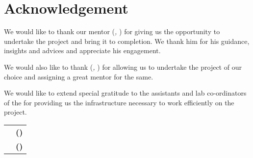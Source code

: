 \clearpage
\chapter*{Acknowledgement}
\label{cha:acknowledgement}
We would like to thank our mentor \textbf{\mentorName{}} (\textit{\mentorJobTitle{}, \departmentName{}}) for giving us the opportunity to undertake the project and bring it to completion. We thank him for his guidance, insights and advices and appreciate his engagement.

We would also like to thank \textbf{\headOfDeptName{}} (\textit{\headOfDeptJobTitle{}, \departmentName{}}) for allowing us to undertake the project of our choice and assigning a great mentor for the same.

We would like to extend special gratitude to the assistants and lab co-ordinators of the \departmentName{} for providing us the infrastructure necessary to work efficiently on the project.

\vfill

\begin{center}
    \begin{tabularx}{\textwidth}{L R}
        & \textbf{\authorAshhar{} (\authorAshharRoll{})}\\
        & \textbf{\authorAdeela{} (\authorAdeelaRoll{})}\\
    \end{tabularx}
\end{center}

